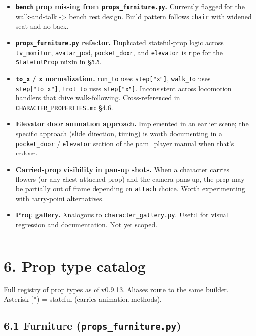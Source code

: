 \documentclass[
  11pt,
]{book}
\providecommand{\tightlist}{%
  \setlength{\itemsep}{0pt}\setlength{\parskip}{0pt}}
\begin{document}
\begin{itemize}
\tightlist
\item
  \textbf{\texttt{bench} prop missing from
  \texttt{props\_furniture.py}.} Currently flagged for the walk-and-talk
  -\textgreater{} bench rest design. Build pattern follows
  \texttt{chair} with widened seat and no back.
\item
  \textbf{\texttt{props\_furniture.py} refactor.} Duplicated
  stateful-prop logic across \texttt{tv\_monitor}, \texttt{avatar\_pod},
  \texttt{pocket\_door}, and \texttt{elevator} is ripe for the
  \texttt{StatefulProp} mixin in §5.5.
\item
  \textbf{\texttt{to\_x} / \texttt{x} normalization.} \texttt{run\_to}
  uses \texttt{step{[}"x"{]}}, \texttt{walk\_to} uses
  \texttt{step{[}"to\_x"{]}}, \texttt{trot\_to} uses
  \texttt{step{[}"x"{]}}. Inconsistent across locomotion handlers that
  drive walk-following. Cross-referenced in
  \texttt{CHARACTER\_PROPERTIES.md} §4.6.
\item
  \textbf{Elevator door animation approach.} Implemented in an earlier
  scene; the specific approach (slide direction, timing) is worth
  documenting in a \texttt{pocket\_door} / \texttt{elevator} section of
  the pam\_player manual when that's redone.
\item
  \textbf{Carried-prop visibility in pan-up shots.} When a character
  carries flowers (or any chest-attached prop) and the camera pans up,
  the prop may be partially out of frame depending on \texttt{attach}
  choice. Worth experimenting with carry-point alternatives.
\item
  \textbf{Prop gallery.} Analogous to \texttt{character\_gallery.py}.
  Useful for visual regression and documentation. Not yet scoped.
\end{itemize}

\begin{center}\rule{0.5\linewidth}{0.5pt}\end{center}

\section{6. Prop type catalog}\label{prop-type-catalog}

Full registry of prop types as of v0.9.13. Aliases route to the same
builder. Asterisk (*) = stateful (carries animation methods).

\subsection{\texorpdfstring{6.1 Furniture
(\texttt{props\_furniture.py})}{6.1 Furniture (props\_furniture.py)}}\label{furniture-props_furniture.py}
\end{document}

